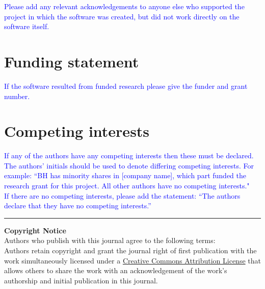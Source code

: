 \documentclass{jors}
\begin{document}
\textcolor{blue}{Please add any relevant acknowledgements to anyone else who supported the project in which the software was created, but did not work directly on the software itself.}

\section*{Funding statement}

\textcolor{blue}{If the software resulted from funded research please give the funder and grant number.}

\section*{Competing interests}

\textcolor{blue}{If any of the authors have any competing interests then these must be declared. The authors’ initials should be used to denote differing competing interests. For example: “BH has minority shares in [company name], which part funded the research grant for this project. All other authors have no competing interests." \\
If there are no competing interests, please add the statement:
“The authors declare that they have no competing interests.” }


\printbibliography



\vspace{2cm}

\rule{\textwidth}{1pt}

{ \bf Copyright Notice} \\
Authors who publish with this journal agree to the following terms: \\

Authors retain copyright and grant the journal right of first publication with the work simultaneously licensed under a  \href{http://creativecommons.org/licenses/by/3.0/}{Creative Commons Attribution License} that allows others to share the work with an acknowledgement of the work's authorship and initial publication in this journal. \\
\end{document}
